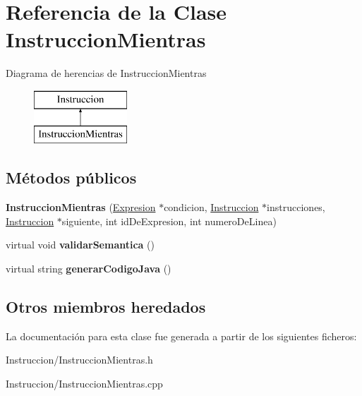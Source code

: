 \hypertarget{class_instruccion_mientras}{\section{Referencia de la Clase Instruccion\-Mientras}
\label{class_instruccion_mientras}
}
Diagrama de herencias de Instruccion\-Mientras\begin{figure}[H]
\begin{center}
\leavevmode
\includegraphics[height=2.000000cm]{class_instruccion_mientras}
\end{center}
\end{figure}
\subsection*{Métodos públicos}
\begin{DoxyCompactItemize}
\item 
\hypertarget{class_instruccion_mientras_a7440d7d6b174efc017dbabdca59c3374}{{\bfseries Instruccion\-Mientras} (\hyperlink{class_expresion}{Expresion} $\ast$condicion, \hyperlink{class_instruccion}{Instruccion} $\ast$instrucciones, \hyperlink{class_instruccion}{Instruccion} $\ast$siguiente, int id\-De\-Expresion, int numero\-De\-Linea)}\label{class_instruccion_mientras_a7440d7d6b174efc017dbabdca59c3374}

\item 
\hypertarget{class_instruccion_mientras_a3f84acd2d81b1fde00dd0c5aafb07503}{virtual void {\bfseries validar\-Semantica} ()}\label{class_instruccion_mientras_a3f84acd2d81b1fde00dd0c5aafb07503}

\item 
\hypertarget{class_instruccion_mientras_afb7d0018cd8f162d117fdab2d3241be6}{virtual string {\bfseries generar\-Codigo\-Java} ()}\label{class_instruccion_mientras_afb7d0018cd8f162d117fdab2d3241be6}

\end{DoxyCompactItemize}
\subsection*{Otros miembros heredados}


La documentación para esta clase fue generada a partir de los siguientes ficheros\-:\begin{DoxyCompactItemize}
\item 
Instruccion/Instruccion\-Mientras.\-h\item 
Instruccion/Instruccion\-Mientras.\-cpp\end{DoxyCompactItemize}
